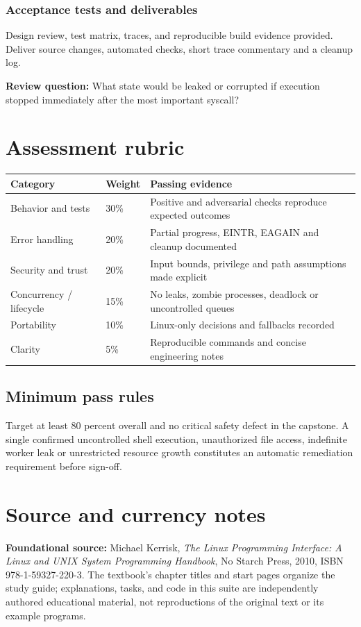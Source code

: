 \documentclass[11pt,letterpaper,oneside]{report}
\begin{document}
\subsection{Acceptance tests and deliverables}
Design review, test matrix, traces, and reproducible build evidence provided. Deliver source changes, automated checks, short trace commentary and a cleanup log.

\textbf{Review question:} What state would be leaked or corrupted if execution stopped immediately after the most important syscall?

\chapter{Assessment rubric}
\begin{longtable}{p{.24\linewidth}p{.11\linewidth}p{.51\linewidth}}\toprule
Category & Weight & Passing evidence\\\midrule\endhead
Behavior and tests & 30\% & Positive and adversarial checks reproduce expected outcomes\\
Error handling & 20\% & Partial progress, EINTR, EAGAIN and cleanup documented\\
Security and trust & 20\% & Input bounds, privilege and path assumptions made explicit\\
Concurrency / lifecycle & 15\% & No leaks, zombie processes, deadlock or uncontrolled queues\\
Portability & 10\% & Linux-only decisions and fallbacks recorded\\
Clarity & 5\% & Reproducible commands and concise engineering notes\\
\bottomrule\end{longtable}\section{Minimum pass rules}
Target at least 80 percent overall and no critical safety defect in the capstone. A single confirmed uncontrolled shell execution, unauthorized file access, indefinite worker leak or unrestricted resource growth constitutes an automatic remediation requirement before sign-off.


\chapter*{Source and currency notes}
\textbf{Foundational source:} Michael Kerrisk, \emph{The Linux Programming Interface: A Linux and UNIX System Programming Handbook}, No Starch Press, 2010, ISBN 978-1-59327-220-3. The textbook's chapter titles and start pages organize the study guide; explanations, tasks, and code in this suite are independently authored educational material, not reproductions of the original text or its example programs.
\end{document}
